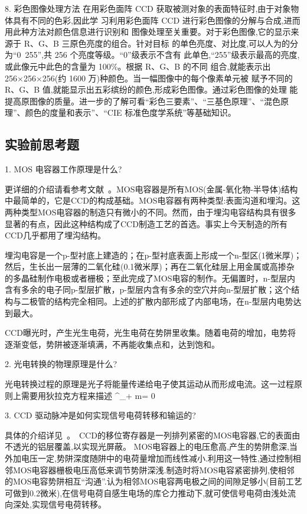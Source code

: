 \documentclass{ctexart}
\begin{document}
8. 彩色图像处理方法
在用彩色面阵 CCD 获取被测对象的表面特征时,由于对象物体具有不同的色彩,因此学
习利用彩色面阵 CCD 进行彩色图像的分解与合成,进而用此种方法对颜色信息进行识别和
图像处理至关重要。对于彩色图像,它的显示来源于 R、G、B 三原色亮度的组合。针对目标
的单色亮度、对比度,可以人为的分为“0~255”,共 256 个亮度等级。“0”级表示不含有
此单色,“255”级表示最高的亮度,或此像元中此色的含量为 100\%。根据 R、G、B 的不同
组合,就能表示出 256×256×256(约 1600 万)种颜色。当一幅图像中的每个像素单元被
赋予不同的 R、G、B 值,就能显示出五彩缤纷的颜色,形成彩色图像。通过彩色图像的处理
能提高原图像的质量。进一步的了解可看“彩色三要素”、“三基色原理”、“混色原理”、颜色的度量和表示”、“CIE 标准色度学系统”等基础知识。
\subsection{实验前思考题}
1. MOS 电容器工作原理是什么?

更详细的介绍请看参考文献~\cite{MOS}。MOS电容器是所有MOS(金属-氧化物-半导体)结构中最简单的，它是CCD的构成基础。MOS电容器有两种类型:表面沟道和埋沟。这两种类型MOS电容器的制造只有微小的不同。然而，由于埋沟电容结构具有很多显著的有点，因此这种结构成了CCD制造工艺的首选。事实上今天制造的所有CCD几乎都用了埋沟结构。

埋沟电容是一个p-型衬底上建造的；在p-型衬底表面上形成一个n-型区(1微米厚)；然后，生长出一层薄的二氧化硅(0.1微米厚)；再在二氧化硅层上用金属或高掺杂的多晶硅制作电极或者栅极；至此完成了MOS电容的制作。无偏置时，n-型层内含有多余的电子同p-型层扩散，p-型层内含有多余的空穴并向n-型层扩散；这个结构与二极管的结构完全相同。上述的扩散内部形成了内部电场，在n-型层内电势达到最大。

CCD曝光时，产生光生电荷，光生电荷在势阱里收集。随着电荷的增加，电势将逐渐变低，势阱被逐渐填满，不再能收集点和，达到饱和。

2. 光电转换的物理原理是什么?

光电转换过程的原理是光子将能量传递给电子使其运动从而形成电流。这一过程原则上需要用狄拉克方程来描述
\beq
{}\gamma^{\mu}\partial_{\mu}\psi + m\psi = 0
\eeq

3. CCD 驱动脉冲是如何实现信号电荷转移和输运的?

具体的介绍详见~\cite{maichong}。　CCD的移位寄存器是一列排列紧密的MOS电容器,它的表面由不透光的铝层覆盖,以实现光屏蔽。 MOS电容器上的电压愈高,产生的势阱愈深,当外加电压一定,势阱深度随阱中的电荷量增加而线性减小.利用这一特性,通过控制相邻MOS电容器栅极电压高低来调节势阱深浅.制造时将MOS电容紧密排列,使相邻的MOS电容势阱相互“沟通”.认为相邻MOS电容两电极之间的间隙足够小(目前工艺可做到0.2微米),在信号电荷自感生电场的库仑力推动下,就可使信号电荷由浅处流向深处,实现信号电荷转移。
\end{document}
